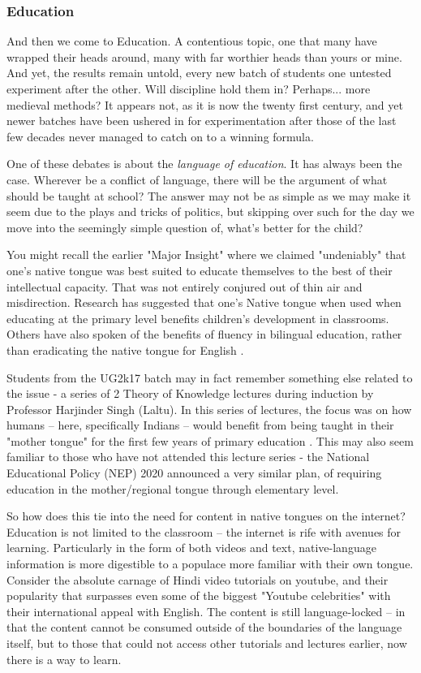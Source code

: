\documentclass[11pt]{article}
\begin{document}
\subsubsection{Education}

And then we come to Education. A contentious topic, one that many have wrapped
their heads around, many with far worthier heads than yours or mine. And yet,
the results remain untold, every new batch of students one untested experiment
after the other. Will discipline hold them in? Perhaps... more medieval methods? 
It appears
not, as it is now the twenty first century, and yet newer batches have been
ushered in for experimentation after those of the last few decades never managed
to catch on to a winning formula.

One of these debates is about the \textit{language of education}. It has always
been the case. Wherever be a conflict of language, there will be the argument of
what should be taught at school? The answer may not be as simple as we may make
it seem due to the plays and tricks of politics, but skipping over such for the
day we move into the seemingly simple question of, what's better for the child?

You might recall the earlier "Major Insight" where we claimed "undeniably" that
one's native tongue was best suited to educate themselves to the best of their
intellectual capacity. That was not entirely conjured out of thin air and
misdirection. Research has suggested \cite{hudelson_role_1987} that one's Native
tongue when used when educating at the primary level benefits children's
development in classrooms. Others have also spoken of the benefits of fluency in
bilingual education, rather than eradicating the native tongue for English
\cite{hakuta_compendium_1986} \cite{cummins_bilingualism_1981}. 

Students from the UG2k17 batch may in fact remember something else related to
the issue - a series of 2 Theory of Knowledge lectures during induction by
Professor Harjinder Singh (Laltu). In this series of lectures, the focus was on
how humans -- here, specifically Indians -- would benefit from being taught in
their "mother tongue" for the first few years of primary education
\cite{noauthor_knowledge_2020}. This may also seem familiar to those who have
not attended this lecture series - the National Educational Policy (NEP) 2020
announced a very similar plan, of requiring education in the mother/regional
tongue through elementary level.

So how does this tie into the need for content in native tongues on the
internet? Education is not limited to the classroom -- the internet is rife with
avenues for learning. Particularly in the form of both videos and text,
native-language information is more digestible to a populace more familiar with
their own tongue. Consider the absolute carnage of Hindi video tutorials on
youtube, and their popularity that surpasses even some of the biggest "Youtube
celebrities" with their international appeal with English. The content is still
language-locked -- in that the content cannot be consumed outside of the
boundaries of the language itself, but to those that could not access other
tutorials and lectures earlier, now there is a way to learn. 
\end{document}
